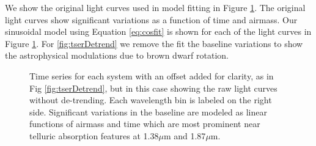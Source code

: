 \documentclass[twocolumn]{aastex6}
\begin{document}
We show the original light curves used in model fitting in Figure \ref{fig:tserNoDetrend}.
The original light curves show significant variations as a function of time and airmass.
Our sinusoidal model using Equation \ref{eq:cosfit} is shown for each of the light curves in Figure \ref{fig:tserNoDetrend}.
For \ref{fig:tserDetrend} we remove the fit the baseline variations to show the astrophysical modulations due to brown dwarf rotation.

\begin{figure}[!t]
\centering
{}
	\caption{Time series for each system with an offset added for clarity, as in Fig \ref{fig:tserDetrend}, but in this case showing the raw light curves without de-trending.
	Each wavelength bin is labeled on the right side. Significant variations in the baseline are modeled as linear functions of airmass and time which are most prominent near telluric absorption features at 1.38$\mu$m and 1.87$\mu$m.}
	\label{fig:tserNoDetrend}
\end{figure} 
\end{document}
